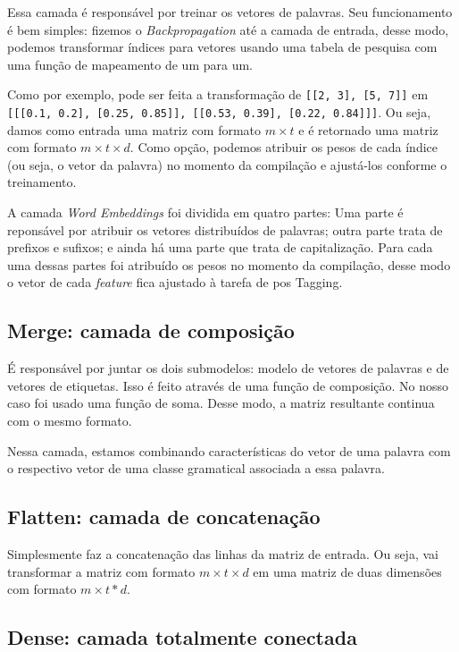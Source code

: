 Essa camada é responsável por treinar os vetores de palavras. Seu funcionamento é bem simples: fizemos o \textit{Backpropagation} até a camada de entrada, desse modo, podemos transformar índices para vetores usando uma tabela de pesquisa com uma função de mapeamento de um para um. 

Como por exemplo, pode ser feita a transformação de \texttt{[[2, 3], [5, 7]]} em \texttt{[[[0.1, 0.2], [0.25, 0.85]], [[0.53, 0.39], [0.22, 0.84]]]}. Ou seja, damos como entrada uma matriz com formato $m \times t$ e é retornado uma matriz com formato $m \times t \times d$. Como opção, podemos atribuir os pesos de cada índice (ou seja, o vetor da palavra) no momento da compilação e ajustá-los conforme o treinamento. 

A camada \textit{Word Embeddings} foi dividida em quatro partes: Uma parte é reponsável por atribuir os vetores distribuídos de palavras; outra parte trata de prefixos e sufixos; e ainda há uma parte que trata de capitalização. Para cada uma dessas partes foi atribuído os pesos no momento da compilação, desse modo o vetor de cada \textit{feature} fica ajustado à tarefa de \ac{pos} Tagging.



\subsection{Merge: camada de composição}

É responsável por juntar os dois submodelos: modelo de vetores de palavras e de vetores de etiquetas. Isso é feito através de uma função de composição. No nosso caso foi usado uma função de soma. Desse modo, a matriz resultante continua com o mesmo formato. 

Nessa camada, estamos combinando características do vetor de uma palavra com o respectivo vetor de uma classe gramatical associada a essa palavra.


\subsection{Flatten: camada de concatenação}

Simplesmente faz a concatenação das linhas da matriz de entrada. Ou seja, vai transformar a matriz com formato $m \times t \times d$ em uma matriz de duas dimensões com formato $m \times t*d$.


\subsection{Dense: camada totalmente conectada}

